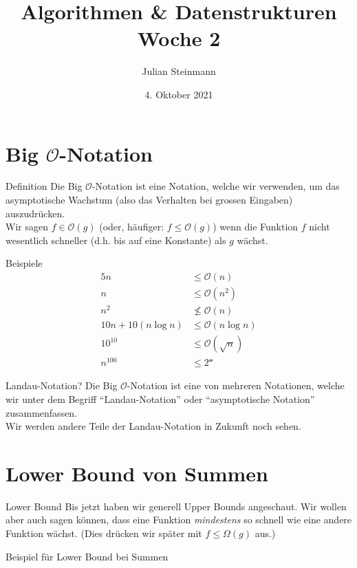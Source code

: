 \documentclass[aspectratio=169]{beamer}
\title{Algorithmen \& Datenstrukturen \\ Woche 2}
\date{4. Oktober 2021}
\author{Julian Steinmann}
\institute{ETH Zürich}
\begin{document}
    \maketitle
    \section{\texorpdfstring{Big \(\mathcal{O}\)-Notation}{Big O-Notation}}
    \begin{frame}{Definition}
       Die Big \(\mathcal{O}\)-Notation ist eine Notation, welche wir verwenden, um das asymptotische Wachstum (also das Verhalten bei grossen Eingaben) auszudrücken. \\ \vspace*{0.5cm}
       Wir sagen \(f \in \mathcal{O}(g)\) (oder, häufiger: \(f \le \mathcal{O}(g)\)) wenn die Funktion \(f\) nicht wesentlich schneller (d.h. bis auf eine Konstante) als \(g\) wächst.
    \end{frame}
    \begin{frame}{Beispiele}
        \begin{align*}
            5n & \le \mathcal{O}(n) \\
            n & \le \mathcal{O}(n^2) \\
            n^2 & \nleq \mathcal{O}(n) \\
            10n + 10(n \log n) & \le \mathcal{O}(n \log n) \\
            10^{10} & \le \mathcal{O}(\sqrt{n}) \\
            n^{100} & \le \mathcal{2^n}
        \end{align*}
    \end{frame}
    \begin{frame}{Landau-Notation?}
        Die Big \(\mathcal{O}\)-Notation ist eine von mehreren Notationen, welche wir unter dem Begriff ``Landau-Notation'' oder ``asymptotische Notation'' zusammenfassen.\\ \vspace*{0.5cm}
        Wir werden andere Teile der Landau-Notation in Zukunft noch sehen.
    \end{frame}
    \section{Lower Bound von Summen}
    \begin{frame}{Lower Bound}
        Bis jetzt haben wir generell Upper Bounds angeschaut. Wir wollen aber auch sagen können, dass eine Funktion \textit{mindestens} so schnell wie eine andere Funktion wächst. (Dies drücken wir später mit \(f \le \Omega(g)\) aus.)
    \end{frame}
    \begin{frame}[standout]
        Beispiel für Lower Bound bei Summen
    \end{frame}
\end{document}
